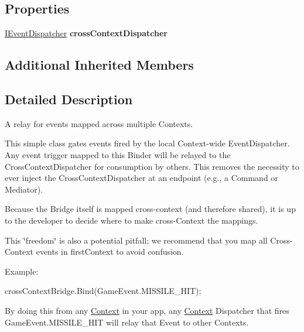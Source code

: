 \subsection*{Properties}
\begin{DoxyCompactItemize}
\item 
\hypertarget{classstrange_1_1extensions_1_1context_1_1impl_1_1_cross_context_bridge_a8c9d156dc45e53c7d4b428ac6bf601c2}{\hyperlink{interfacestrange_1_1extensions_1_1dispatcher_1_1eventdispatcher_1_1api_1_1_i_event_dispatcher}{I\-Event\-Dispatcher} {\bfseries cross\-Context\-Dispatcher}}\label{classstrange_1_1extensions_1_1context_1_1impl_1_1_cross_context_bridge_a8c9d156dc45e53c7d4b428ac6bf601c2}

\end{DoxyCompactItemize}
\subsection*{Additional Inherited Members}


\subsection{Detailed Description}
A relay for events mapped across multiple Contexts. 

This simple class gates events fired by the local Context-\/wide Event\-Dispatcher. Any event trigger mapped to this Binder will be relayed to the Cross\-Context\-Dispatcher for consumption by others. This removes the necessity to ever inject the Cross\-Context\-Dispatcher at an endpoint (e.\-g., a Command or Mediator).

Because the Bridge itself is mapped cross-\/context (and therefore shared), it is up to the developer to decide where to make cross-\/\-Context the mappings.

This \char`\"{}freedom\char`\"{} is also a potential pitfall; we recommend that you map all Cross-\/\-Context events in first\-Context to avoid confusion.

Example\-:

cross\-Context\-Bridge.\-Bind(Game\-Event.\-M\-I\-S\-S\-I\-L\-E\-\_\-\-H\-I\-T);

By doing this from any \hyperlink{classstrange_1_1extensions_1_1context_1_1impl_1_1_context}{Context} in your app, any \hyperlink{classstrange_1_1extensions_1_1context_1_1impl_1_1_context}{Context} Dispatcher that fires {\ttfamily Game\-Event.\-M\-I\-S\-S\-I\-L\-E\-\_\-\-H\-I\-T} will relay that Event to other Contexts. 

